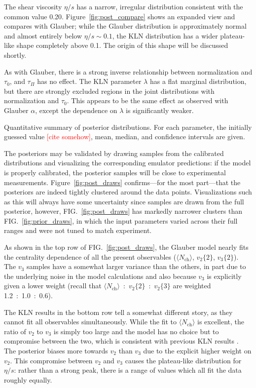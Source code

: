 \documentclass[aps,prc,reprint,superscriptaddress,amsmath]{revtex4-1}
\newcommand{\todo}[1]{\textcolor{red}{#1}}
\newcommand{\avg}[1]{\langle #1 \rangle}
\newcommand{\nch}{N_\text{ch}}
\newcommand{\vnk}[2]{v_#1\{#2\}}
\begin{document}
The shear viscosity $\eta/s$ has a narrow, irregular distribution consistent with the common value 0.20.
Figure~\ref{fig:post_compare} shows an expanded view and compares with Glauber;
while the Glauber distribution is approximately normal and almost entirely below $\eta/s \sim 0.1$, the KLN distribution has a wider plateau-like shape completely above 0.1.
The origin of this shape will be discussed shortly.

As with Glauber, there is a strong inverse relationship between normalization and $\tau_0$, and $\tau_\Pi$ has no effect.
The KLN parameter $\lambda$ has a flat marginal distribution, but there are strongly excluded regions in the joint distributions with normalization and $\tau_0$.
This appears to be the same effect as observed with Glauber $\alpha$, except the dependence on $\lambda$ is significantly weaker.

\begin{table*}
  \caption{
    \label{tab:posterior}
    Quantitative summary of posterior distributions.
    For each parameter, the initially guessed value \todo{[cite somehow]}, mean, median, and confidence intervals are given.
  }
  
\end{table*}

The posteriors may be validated by drawing samples from the calibrated distributions and visualizing the corresponding emulator predictions:
if the model is properly calibrated, the posterior samples will be close to experimental measurements.
Figure~\ref{fig:post_draws} confirms---for the most part---that the posteriors are indeed tightly clustered around the data points.
Visualizations such as this will always have some uncertainty since samples are drawn from the full posterior, however, FIG.~\ref{fig:post_draws} has markedly narrower clusters than FIG.~\ref{fig:prior_draws}, in which the input parameters varied across their full ranges and were not tuned to match experiment.

As shown in the top row of FIG.~\ref{fig:post_draws}, the Glauber model nearly fits the centrality dependence of all the present observables ($\avg\nch$, $\vnk 2 2$, $\vnk 3 2$).
The $v_3$ samples have a somewhat larger variance than the others, in part due to the underlying noise in the model calculations and also because $v_3$ is explicitly given a lower weight (recall that $\avg\nch$~:~$\vnk 2 2$~:~$\vnk 2 3$ are weighted 1.2~:~1.0~:~0.6).

The KLN results in the bottom row tell a somewhat different story, as they cannot fit all observables simultaneously.
While the fit to $\avg\nch$ is excellent, the ratio of $v_2$ to $v_3$ is simply too large and the model has no choice but to compromise between the two, which is consistent with previous KLN results \cite{}.
The posterior biases more towards $v_2$ than $v_3$ due to the explicit higher weight on $v_2$.
This compromise between $v_2$ and $v_3$ causes the plateau-like distribution for $\eta/s$: rather than a strong peak, there is a range of values which all fit the data roughly equally.
\end{document}
